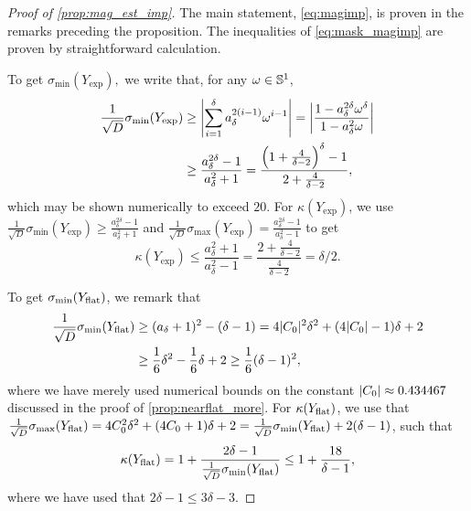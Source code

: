 \begin{proof}[Proof of \cref{prop:mag_est_imp}]
  The main statement, \eqref{eq:magimp}, is proven in the remarks preceding the proposition.  The inequalities of \eqref{eq:mask_magimp} are proven by straightforward calculation.

  To get $\sigma_{\min}(Y_{\exp}),$ we write that, for any $\omega \in \Sbb^1$,
  \begin{align*}
    \frac{1}{\sqrt{D}} \sigma_{\min}(Y_{\exp}) &\ge \abs*{\sum_{i = 1}^\delta a_\delta^{2(i - 1)} \omega^{i - 1}} = \abs*{\dfrac{1 - a_\delta^{2 \delta} \omega^\delta}{1 - a_\delta^2 \omega}} \\
    &\ge \dfrac{a_\delta^{2 \delta} - 1}{a_\delta^2 + 1} = \dfrac{\left(1 + \frac{4}{\delta - 2}\right)^\delta - 1}{2 + \frac{4}{\delta - 2}},
  \end{align*}
  which may be shown numerically to exceed $20$.  For $\kappa(Y_{\exp})$, we use $\frac{1}{\sqrt{D}} \sigma_{\min}(Y_{\exp}) \ge \frac{a_\delta^{2 \delta} - 1}{a_\delta^2 + 1}$ and $\frac{1}{\sqrt{D}} \sigma_{\max}(Y_{\exp}) = \frac{a_\delta^{2 \delta} - 1}{a_\delta^2 - 1}$ to get \[\kappa(Y_{\exp}) \le \dfrac{a_\delta^2 + 1}{a_\delta^2 - 1} = \dfrac{2 + \frac{4}{\delta - 2}}{\frac{4}{\delta - 2}} = \delta / 2.\]

  To get $\sigma_{\min}(Y_{\rm flat})$, we remark that 
  \begin{align*}
    \frac{1}{\sqrt{D}} \sigma_{\min}(Y_{\rm flat}) &\ge (a_\delta + 1)^2 - (\delta - 1) = 4 \abs{C_0}^2 \delta^2 + (4 \abs{C_0} - 1) \delta + 2 \\
    &\ge \frac{1}{6} \delta^2 - \frac{1}{6} \delta + 2 \ge \frac{1}{6}(\delta - 1)^2,
  \end{align*}
  where we have merely used numerical bounds on the constant $\abs{C_0} \approx 0.434467$ discussed in the proof of \cref{prop:nearflat_more}.  For $\kappa(Y_{\rm flat})$, we use that $\frac{1}{\sqrt{D}} \sigma_{\max}(Y_{\rm flat}) = 4 C_0^2 \delta^2 + (4 C_0 + 1) \delta + 2 = \frac{1}{\sqrt{D}} \sigma_{\min}(Y_{\rm flat}) + 2 (\delta - 1)$, such that \[\kappa(Y_{\rm flat}) = 1 + \dfrac{2 \delta - 1}{\frac{1}{\sqrt{D}} \sigma_{\min}(Y_{\rm flat})} \le 1 + \dfrac{18}{\delta - 1},\] where we have used that $2 \delta - 1 \le 3 \delta - 3$.  
\end{proof}
